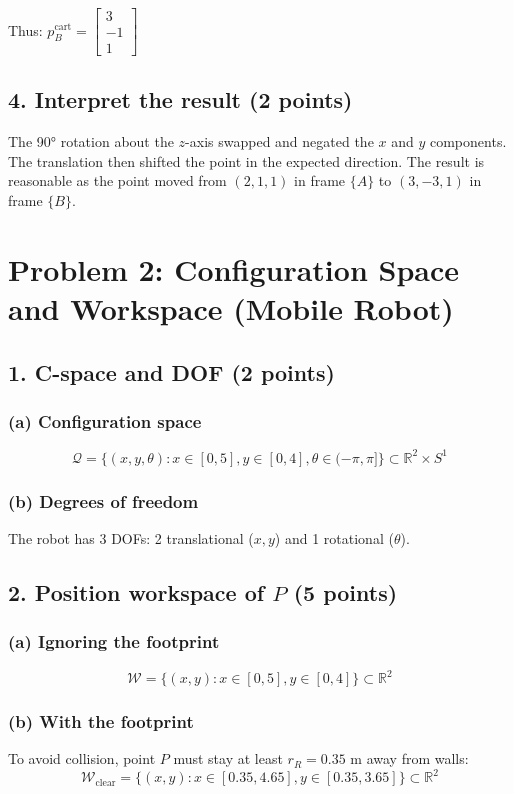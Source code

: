 \documentclass[11pt]{article}
\begin{document}
Thus: $p_B^{\text{cart}} = \begin{bmatrix} 3 \\ -1 \\ 1 \end{bmatrix}$

\subsection*{4. Interpret the result (2 points)}
The 90° rotation about the $z$-axis swapped and negated the $x$ and $y$ components. The translation then shifted the point in the expected direction. The result is reasonable as the point moved from $(2,1,1)$ in frame $\{A\}$ to $(3,-3,1)$ in frame $\{B\}$.

\section*{Problem 2: Configuration Space and Workspace (Mobile Robot)}

\subsection*{1. C-space and DOF (2 points)}
\subsubsection*{(a) Configuration space}
$$\mathcal{Q} = \{(x, y, \theta) : x \in [0, 5], y \in [0, 4], \theta \in (-\pi, \pi]\} \subset \mathbb{R}^2 \times S^1$$

\subsubsection*{(b) Degrees of freedom}
The robot has 3 DOFs: 2 translational ($x, y$) and 1 rotational ($\theta$).

\subsection*{2. Position workspace of $P$ (5 points)}
\subsubsection*{(a) Ignoring the footprint}
$$\mathcal{W} = \{(x, y) : x \in [0, 5], y \in [0, 4]\} \subset \mathbb{R}^2$$

\subsubsection*{(b) With the footprint}
To avoid collision, point $P$ must stay at least $r_R = 0.35$ m away from walls:
$$\mathcal{W}_{\text{clear}} = \{(x, y) : x \in [0.35, 4.65], y \in [0.35, 3.65]\} \subset \mathbb{R}^2$$
\end{document}
